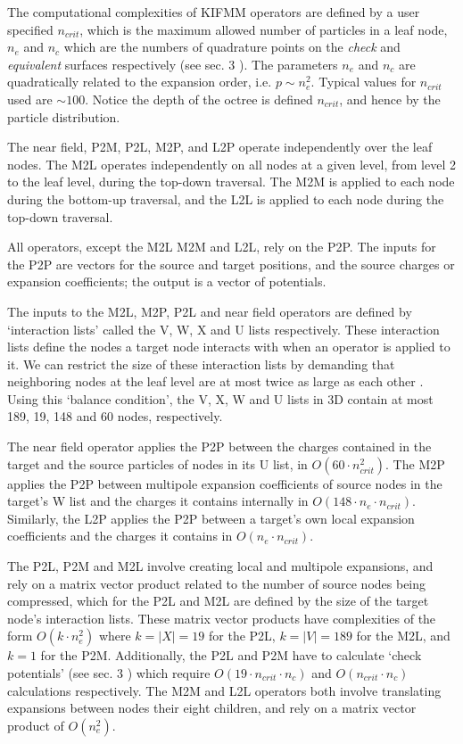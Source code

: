 \documentclass{IEEEcsmag}
\begin{document}
The computational complexities of KIFMM operators are defined by a user specified $n_{crit}$, which is the maximum allowed number of particles in a leaf node, $n_e$ and $n_c$ which are the numbers of quadrature points on the \textit{check} and \textit{equivalent} surfaces respectively (see sec. 3 \cite{Ying2004}). The parameters $n_e$ and $n_c$ are quadratically related to the expansion order, i.e. $p \sim n_e^2$. Typical values for $n_{crit}$ used are $\sim 100$. Notice the depth of the octree is defined $n_{crit}$, and hence by the particle distribution.

The near field, P2M, P2L, M2P, and L2P operate independently over the leaf nodes. The M2L operates independently on all nodes at a given level, from level 2 to the leaf level, during the top-down traversal. The M2M is applied to each node during the bottom-up traversal, and the L2L is applied to each node during the top-down traversal.

All operators, except the M2L M2M and L2L, rely on the P2P. The inputs for the P2P are vectors for the source and target positions, and the source charges or expansion coefficients; the output is a vector of potentials.

The inputs to the M2L, M2P, P2L and near field operators are defined by `interaction lists' called the V, W, X and U lists respectively. These interaction lists define the nodes a target node interacts with when an operator is applied to it. We can restrict the size of these interaction lists by demanding that neighboring nodes at the leaf level are at most twice as large as each other \cite{Sundar2007}. Using this `balance condition', the V, X, W and U lists in 3D contain at most 189, 19, 148 and 60 nodes, respectively.

The near field operator applies the P2P between the charges contained in the target and the source particles of nodes in its U list, in $O(60 \cdot n_{crit}^2)$. The M2P applies the P2P between multipole expansion coefficients of source nodes in the target's W list and the charges it contains internally in $O(148 \cdot n_e \cdot n_{crit})$. Similarly, the L2P applies the P2P between a target's own local expansion coefficients and the charges it contains in $O(n_e \cdot n_{crit})$.

The P2L, P2M and M2L involve creating local and multipole expansions, and rely on a matrix vector product related to the number of source nodes being compressed, which for the P2L and M2L are defined by the size of the target node's interaction lists. These matrix vector products have complexities of the form $O(k \cdot n_e^2)$ where $k = |X| = 19$ for the P2L, $k = |V| = 189$ for the M2L, and $k = 1$ for the P2M. Additionally, the P2L and P2M have to calculate `check potentials' (see sec. 3 \cite{Ying2004}) which require $O(19 \cdot n_{crit} \cdot n_c)$ and $O(n_{crit} \cdot n_c)$ calculations respectively. The M2M and L2L operators both involve translating expansions between nodes their eight children, and rely on a matrix vector product of $O(n_e^2)$.
\end{document}
